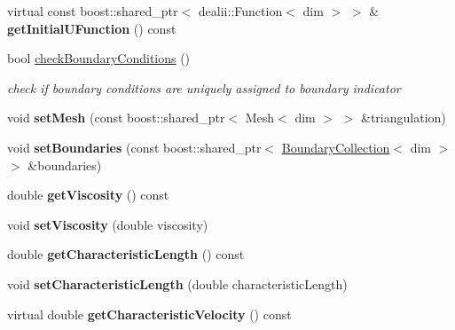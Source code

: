 \begin{DoxyCompactItemize}
\item 
\hypertarget{classnatrium_1_1ProblemDescription_a008bd19c317f7907229c5cab7a646ea0}{
virtual const boost::shared\_\-ptr$<$ dealii::Function$<$ dim $>$ $>$ \& {\bfseries getInitialUFunction} () const }
\label{classnatrium_1_1ProblemDescription_a008bd19c317f7907229c5cab7a646ea0}

\item 
bool \hyperlink{classnatrium_1_1ProblemDescription_aed8ec93fcba6c0b78c04ef91b8703f7a}{checkBoundaryConditions} ()
\begin{DoxyCompactList}\small\item\em check if boundary conditions are uniquely assigned to boundary indicator \item\end{DoxyCompactList}\item 
\hypertarget{classnatrium_1_1ProblemDescription_afeb7e2a712c3fb816d8491cb01d02156}{
void {\bfseries setMesh} (const boost::shared\_\-ptr$<$ Mesh$<$ dim $>$ $>$ \&triangulation)}
\label{classnatrium_1_1ProblemDescription_afeb7e2a712c3fb816d8491cb01d02156}

\item 
\hypertarget{classnatrium_1_1ProblemDescription_a9078dc3c0da45f600e8b2375f321494e}{
void {\bfseries setBoundaries} (const boost::shared\_\-ptr$<$ \hyperlink{classnatrium_1_1BoundaryCollection}{BoundaryCollection}$<$ dim $>$ $>$ \&boundaries)}
\label{classnatrium_1_1ProblemDescription_a9078dc3c0da45f600e8b2375f321494e}

\item 
\hypertarget{classnatrium_1_1ProblemDescription_a582ecf296837d78a8a00fd598de38de2}{
double {\bfseries getViscosity} () const }
\label{classnatrium_1_1ProblemDescription_a582ecf296837d78a8a00fd598de38de2}

\item 
\hypertarget{classnatrium_1_1ProblemDescription_ad624cab941ab79af0422e5f7c735e8d8}{
void {\bfseries setViscosity} (double viscosity)}
\label{classnatrium_1_1ProblemDescription_ad624cab941ab79af0422e5f7c735e8d8}

\item 
\hypertarget{classnatrium_1_1ProblemDescription_ac424dbc36ad2d61d128f3656a8d6952d}{
double {\bfseries getCharacteristicLength} () const }
\label{classnatrium_1_1ProblemDescription_ac424dbc36ad2d61d128f3656a8d6952d}

\item 
\hypertarget{classnatrium_1_1ProblemDescription_adc48f96c34c6318d911bbc41582c202b}{
void {\bfseries setCharacteristicLength} (double characteristicLength)}
\label{classnatrium_1_1ProblemDescription_adc48f96c34c6318d911bbc41582c202b}

\item 
\hypertarget{classnatrium_1_1ProblemDescription_a3af2ccea3bfbb7d1aa39570579fcf937}{
virtual double {\bfseries getCharacteristicVelocity} () const }
\label{classnatrium_1_1ProblemDescription_a3af2ccea3bfbb7d1aa39570579fcf937}

\end{DoxyCompactItemize}
